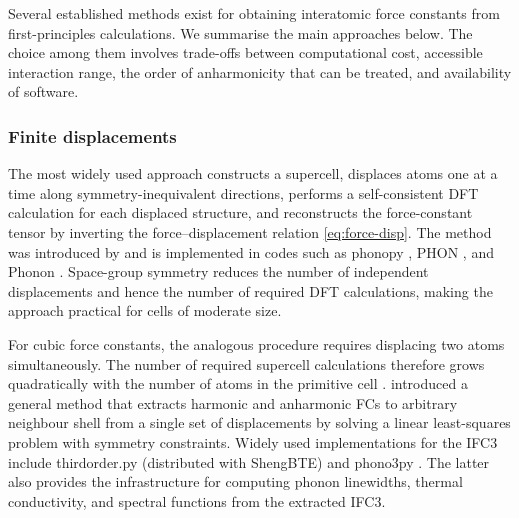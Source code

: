 Several established methods exist for obtaining interatomic force
constants from first-principles calculations.  We summarise the
main approaches below. The choice among them involves trade-offs
between computational cost, accessible interaction range, the
order of anharmonicity that can be treated, and availability of software.

\subsubsection{Finite displacements}
\label{ssub:fd_fc}
The most widely used approach constructs a supercell, displaces atoms
one at a time along symmetry-inequivalent directions, performs a
self-consistent DFT calculation for each displaced structure, and
reconstructs the force-constant tensor by inverting the
force--displacement relation \cref{eq:force-disp}.  The method was
introduced by \citet{parlinski_first-principles_1997} and is
implemented in codes such as phonopy \cite{togo_first_2015},
PHON \cite{alfe_phon_2009}, and Phonon
\cite{parlinski_first-principles_1997}.  Space-group symmetry reduces
the number of independent displacements and hence the number of
required DFT calculations, making the approach practical for cells of
moderate size.

For cubic force constants, the analogous procedure requires displacing
two atoms simultaneously. The number of required supercell
calculations therefore grows quadratically with the number of atoms in
the primitive cell
\cite{esfarjani_method_2008, li_shengbte_2014}.  
introduced a general method that extracts harmonic and anharmonic FCs
to arbitrary neighbour shell from a single set of displacements by
solving a linear least-squares problem with symmetry constraints.
Widely used implementations for the IFC3 include thirdorder.py
(distributed with ShengBTE) \cite{li_shengbte_2014} and phono3py
\cite{togo_implementation_2023}.  The
latter also provides the infrastructure for computing phonon
linewidths, thermal conductivity, and spectral functions from the
extracted IFC3.

